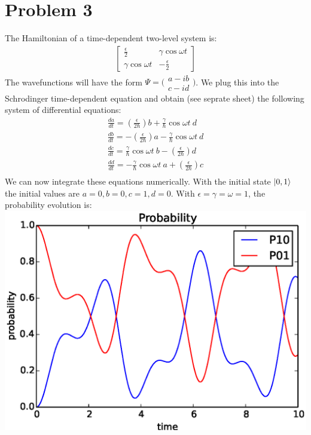 \documentclass[a4paper,12pt]{article}
\numberwithin{equation}{section}
\begin{document}
\section{Problem 3}
The Hamiltonian of a time-dependent two-level system is:
\begin{gather}
 \begin{bmatrix}
  \frac{\epsilon}{2} & \gamma \cos \omega t\\
  \gamma \cos \omega t   & -\frac{\epsilon}{2}
 \end{bmatrix}
\end{gather}
The wavefunctions will have the form $\Psi = \bigl( \begin{smallmatrix}a-ib \\ c-id \end{smallmatrix} \bigr)$.
We plug this into the Schrodinger time-dependent equation and obtain (see seprate sheet) the following system of differential equations:
\begin{align}
 \frac{da}{dt}=(\frac{\epsilon}{2 \hbar})b+\frac{\gamma}{\hbar}\cos{\omega t}\ d\\
 \frac{db}{dt}=-(\frac{\epsilon}{2 \hbar})a-\frac{\gamma}{\hbar}\cos{\omega t}\ d\\
 \frac{dc}{dt}=\frac{\gamma}{\hbar}\cos{\omega t}\ b -(\frac{\epsilon}{2 \hbar})d\\
 \frac{dd}{dt}=-\frac{\gamma}{\hbar}\cos{\omega t}\ a +(\frac{\epsilon}{2 \hbar})c\\
\end{align}
We can now integrate these equations numerically. 
With the initial state $\ket{0,1}$ the initial values are $a=0,b=0,c=1,d=0$.
With $\epsilon=\gamma=\omega=1$, the probability evolution is:\\
\includegraphics{p3_e1y1w1}
\end{document}
